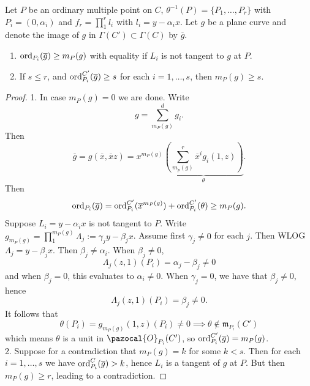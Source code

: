         \begin{proposition}\label{AffineOrderLemma}
            Let $P$ be an ordinary multiple point on $C$, $\theta^{-1}(P)=\{P_1,\dots,P_r\}$ with $P_i = (0,\alpha_i)$ and $f_r = \prod_1^r l_i$ with $l_i = y-\alpha_i x$. Let $g$ be a plane curve and denote the image of $g$ in $\Gamma(C')\subset \Gamma(C)$ by $\overline{g}$. 
            \begin{enumerate}
                \item $\mathrm{ord}_{P_i}(\overline{g})\geq m_{P}(g)$ with equality if $L_i$ is not tangent to $g$ at $P$.
                \item If $s\leq r$, and $\mathrm{ord}_{P_i}^{C'}(\overline{g})\geq s$ for each $i=1,\dots,s$, then $m_P(g)\geq s$.
            \end{enumerate}
        \end{proposition}
        \begin{proof}
            1. In case $m_P(g)=0$ we are done. Write 
            $$
                g = \sum_{m_P(g)}^d g_i.
            $$
            Then 
            $$
                \overline{g} = g(\overline{x},\overline{x}z) = x^{m_P(g)}\underbrace{\left( \sum_{m_p(g)}^r \overline{x}^ig_i(1,z)\right)}_{\theta}.
            $$ 
            Then 
            $$
                \mathrm{ord}_{P_i}(\overline{g})=\mathrm{ord}_{P_i}^{C'}(\overline{x}^{m_P(g)})+\mathrm{ord}_{P_i}^{C'}(\theta) \geq m_{P}(g).
            $$
            Suppose $L_i=y-\alpha_i x$ is not tangent to $P$. Write $g_{m_P(g)} = \prod_1^{m_P(g)} \Lambda_j:= \gamma_j y-\beta_j x$. Assume first $\gamma_j\neq 0$ for each $j$. Then WLOG $\Lambda_j = y-\beta_jx$. Then $\beta_j\neq \alpha_i$. When $\beta_j\neq 0$,  
            $$
                \Lambda_j(z,1)(P_i) = \alpha_j-\beta_j\neq 0
            $$
            and when $\beta_j=0$, this evaluates to $\alpha_i\neq 0$. When $\gamma_j=0$, we have that $\beta_j\neq 0$, hence 
            $$
                \Lambda_j(z,1)(P_i)=\beta_j\neq 0.
            $$ 
            It follows that 
            $$
               \theta(P_i) = g_{m_P(g)}(1,z)(P_i)\neq 0\implies \theta\notin \mathfrak{m}_{P_i}(C')
            $$
            which means $\theta$ is a unit in $\pazocal{O}_{P_i}(C')$, so $\mathrm{ord}_{P_i}^{C'}(\overline{g})=m_{P}(g)$.\\
            2. Suppose for a contradiction that $m_P(g)=k$ for some $k<s$. Then for each $i=1,\dots,s$ we have $\mathrm{ord}_{P_i}^C(\overline{g})>k$, hence $L_i$ is a tangent of $g$ at $P$. But then $m_P(g)\geq r$, leading to a contradiction. 
        \end{proof}
